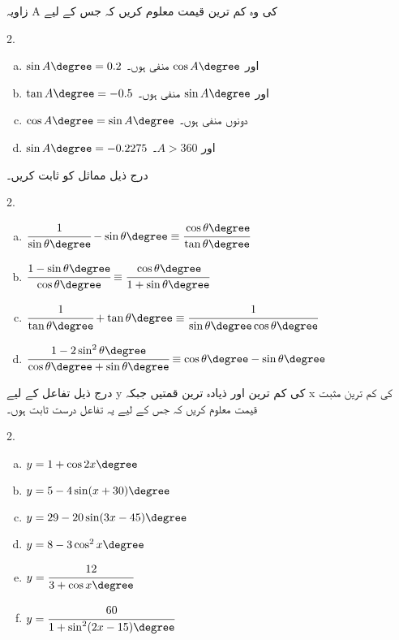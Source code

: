 زاویہ A کی وہ کم ترین قیمت معلوم کریں کہ جس کے لیے
\begin{multicols}{2.}
\begin{enumerate}[a.]
\item
\(\sin A\degree=0.2\)
اور \(\cos A\degree\) منفی ہوں۔
\item
 \(\tan A\degree=-0.5 \)
اور \(\sin A\degree \) منفی ہوں۔
\item
\(\cos A\degree=\sin A\degree \)
دونوں منفی ہوں۔
\item
\(\sin A\degree=-0.2275 \)
اور \(A>360 \)۔
\end{enumerate}
\end{multicols}
درج ذیل مماثل کو ثابت کریں۔
\begin{multicols}{2.}
\begin{enumerate}[a.]
\item   \(\cfrac{1}{\sin\theta\degree}-\sin\theta\degree\equiv\cfrac{\cos\theta\degree}{\tan\theta\degree} \)
\item  \(\cfrac{1-\sin\theta\degree}{\cos\theta\degree}\equiv\cfrac{\cos\theta\degree}{1+\sin\theta\degree}\)
\item    \(\cfrac{1}{\tan\theta\degree}+\tan\theta\degree\equiv\cfrac{1}{\sin\theta\degree\cos\theta\degree} \)
\item     \(\cfrac{1-2\sin^2\theta\degree}{\cos\theta\degree+\sin\theta\degree}\equiv \cos\theta\degree-\sin\theta\degree \)
\end{enumerate}
\end{multicols}
درج ذیل تفاعل کے لیے y کی کم ترین اور ذیادہ ترین قمتیں جبکہ x کی کم ترین مثبت قیمت معلوم کریں کہ جس کے لیے یہ تفاعل درست ثابت ہوں۔
\begin{multicols}{2.}
\begin{enumerate}[a.]
\item  \(y=1+\cos2x\degree \)
\item   \(y=5-4\sin(x+30)\degree \)
\item     \(y=29-20\sin(3x-45)\degree \)
\item  \(y=8-3\cos^2x\degree \)
\item   \(y=\cfrac{12}{3+\cos x\degree} \)
\item  \(y=\cfrac{60}{1+\sin^2(2x-15)\degree} \)
\end{enumerate}
\end{multicols}

